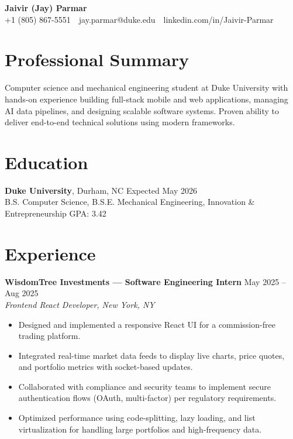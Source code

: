 \documentclass[11pt]{article}
\begin{document}
\begin{center}
    {\LARGE \textbf{Jaivir (Jay) Parmar}}\\[0.2cm]
    +1 (805) 867-5551 \,\, jay.parmar@duke.edu \,\, linkedin.com/in/Jaivir-Parmar
\end{center}

\section*{Professional Summary}
Computer science and mechanical engineering student at Duke University with hands-on experience building full-stack mobile and web applications, managing AI data pipelines, and designing scalable software systems. Proven ability to deliver end-to-end technical solutions using modern frameworks.

\section*{Education}
\textbf{Duke University}, Durham, NC \hfill Expected May 2026\\
 B.S. Computer Science, B.S.E. Mechanical Engineering, Innovation \& Entrepreneurship \hfill GPA: 3.42

\section*{Experience}

\textbf{WisdomTree Investments — Software Engineering Intern} \hfill May 2025 -- Aug 2025\\
\textit{Frontend React Developer, New York, NY}
\begin{itemize}
    \item Designed and implemented a responsive React UI for a commission-free trading platform.
    \item Integrated real-time market data feeds to display live charts, price quotes, and portfolio metrics with socket-based updates.
    \item Collaborated with compliance and security teams to implement secure authentication flows (OAuth, multi-factor) per regulatory requirements.
    \item Optimized performance using code-splitting, lazy loading, and list virtualization for handling large portfolios and high-frequency data.

\end{itemize}
\end{document}
